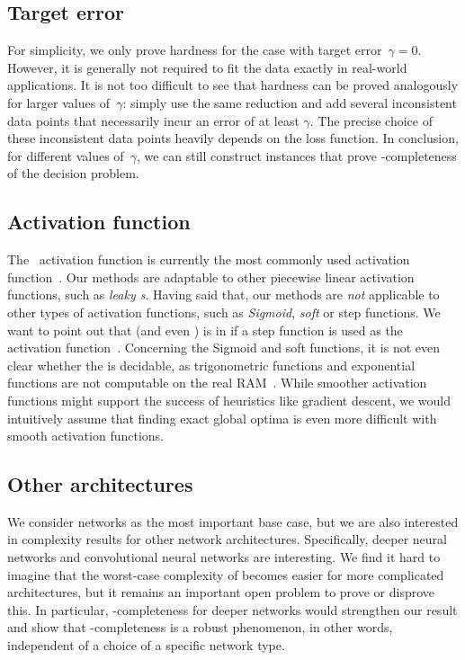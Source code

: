 \subsection{Target error}
For simplicity, we only prove hardness for the case with target error~$\gamma = 0$.
However, it is generally not required to fit the data exactly in real-world applications.
It is not too difficult to see that hardness can be proved analogously for larger values of~$\gamma$: simply use the same reduction and add %
several  %
inconsistent data points that necessarily incur an error of at least $\gamma$.
The precise choice of these inconsistent data points heavily depends on the loss function.
In conclusion, for different values of~$\gamma$, we can still construct instances that prove \ER-completeness of the decision problem.

\subsection{Activation function}
The \ReLU~activation function is currently the most commonly used activation function~\cite{Arora2018_Understanding, Glorot2011_DeepSparse, Goodfellow2016_DeepLearning}.
%
%
%
Our methods are adaptable to other piecewise linear activation functions, such as 
\emph{leaky \ReLU{}s}.
Having said that, our methods are \emph{not} applicable to other types of activation functions, such as \emph{Sigmoid}, \emph{soft \ReLU} or step functions.
We want to point out that \trainNN (and even \ERM) is in \NP{} if a step function is used as the activation function~\cite{Khalife2023_Threshold}.
Concerning the Sigmoid and soft \ReLU %
functions,  %
it is not even clear whether the \ERM is decidable, as trigonometric functions and exponential functions are not computable on the real RAM~\cite{Erickson2022_SmoothingTheGap, Richardson1969_Undecidable}. %
While smoother activation functions might support the success of heuristics like gradient descent, we would intuitively assume that finding exact global optima is even more difficult with smooth activation functions.

\subsection{Other architectures}
We consider \fullyconnected \twolayer networks as the most important base case, but we are also interested in complexity results for other network architectures.
Specifically, deeper \fullyconnected neural networks and convolutional neural networks are interesting.
We find it hard to imagine that the worst-case complexity of \ERM becomes easier for more complicated architectures, but it remains an important open problem to prove or disprove this. In particular, \ER-completeness for deeper networks would strengthen our result and show that \ER-completeness is a robust phenomenon, in other words, independent of a choice of a specific network type.

